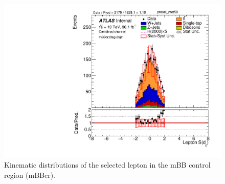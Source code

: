 \begin{figure}[!h]
\begin{center}
\includegraphics[scale=0.33]{./figures/boosted/PlotsInMbbCR/DataMC_2tag_0bjet_mbbcr_lepton_presel_met50_Lep_d0sigL}
\caption{Kinematic distributions of the selected lepton in the mBB control region (mBBcr).}
\label{fig:boosted_mbbcr_lepton}
\end{center}
\end{figure}
 \newpage
 
